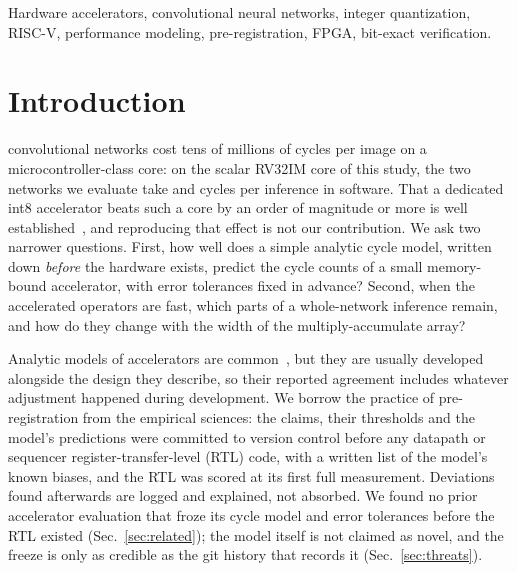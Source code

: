 \documentclass[journal]{IEEEtran}
\begin{document}
\begin{IEEEkeywords}
Hardware accelerators, convolutional neural networks, integer quantization, RISC-V, performance modeling, pre-registration, FPGA, bit-exact verification.
\end{IEEEkeywords}

\section{Introduction}\label{sec:intro}
 convolutional networks cost tens of millions of cycles per image on a microcontroller-class core: on the scalar RV32IM core of this study, the two networks we evaluate take \BaselineCyclesMnist{} and \BaselineCyclesCifar{} cycles per inference in software. That a dedicated int8 accelerator beats such a core by an order of magnitude or more is well established~\cite{genc2021gemmini,prakash2023cfu,moreau2018vta,yildirim2025dsc}, and reproducing that effect is not our contribution. We ask two narrower questions. First, how well does a simple analytic cycle model, written down \emph{before} the hardware exists, predict the cycle counts of a small memory-bound accelerator, with error tolerances fixed in advance? Second, when the accelerated operators are fast, which parts of a whole-network inference remain, and how do they change with the width of the multiply-accumulate array?

Analytic models of accelerators are common~\cite{zhang2015optimizing,alwani2016fused,williams2009roofline}, but they are usually developed alongside the design they describe, so their reported agreement includes whatever adjustment happened during development. We borrow the practice of pre-registration from the empirical sciences: the claims, their thresholds and the model's predictions were committed to version control before any datapath or sequencer register-transfer-level (RTL) code, with a written list of the model's known biases, and the RTL was scored at its first full measurement. Deviations found afterwards are logged and explained, not absorbed. We found no prior accelerator evaluation that froze its cycle model and error tolerances before the RTL existed (Sec.~\ref{sec:related}); the model itself is not claimed as novel, and the freeze is only as credible as the git history that records it (Sec.~\ref{sec:threats}).
\end{document}
